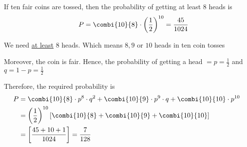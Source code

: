 \documentclass[14pt,fleqn]{extarticle}
\begin{document}
 
\begin{snippet}
    
    \incorrect
    
    If ten fair coins are tossed, then the probability of getting 
    at least $8$ heads is 
    \[ \qquad P = \combi{10}{8}\cdot \left(\frac{1}{2} \right)^{10} = \frac{45}{1024}\]
    \reason
    
    We need \underline{at least} $8$ heads. Which means $8,9$ or $10$ heads in ten coin tosses \newline 

    Moreover, the coin is fair. Hence, the probability of getting a head $=p=\frac{1}{2}$ and $q = 1-p = \frac{1}{2}$ \newline 
        
    Therefore, the required probability is 
    \begin{align}
	P &= \combi{10}{8}\cdot p^8\cdot q^2 + \combi{10}{9}\cdot p^9\cdot q + \combi{10}{10}\cdot p^{10} \\
	&= \left(\frac{1}{2} \right)^{10} \left[\combi{10}{8} + \combi{10}{9} + \combi{10}{10} \right] \\
	&= \left[ \frac{45+10+1}{1024}\right] = \frac{7}{128}
\end{align}
\end{snippet} 
\end{document}
